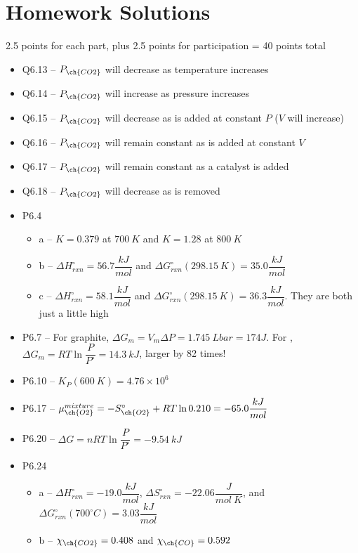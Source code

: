 \documentclass[12pt, openany, letterpaper]{memoir}
\begin{document}
\section*{Homework Solutions}
2.5 points for each part, plus 2.5 points for participation = 40 points total
\begin{itemize}
	\item Q6.13 -- $P_{\ch{CO2}}$ will decrease as temperature increases
	\item Q6.14 -- $P_{\ch{CO2}}$ will increase as pressure increases
	\item Q6.15 -- $P_{\ch{CO2}}$ will decrease as  is added at constant $P$ ($V$ will increase)
	\item Q6.16 -- $P_{\ch{CO2}}$ will remain constant as  is added at constant $V$
	\item Q6.17 -- $P_{\ch{CO2}}$ will remain constant as a catalyst is added
	\item Q6.18 -- $P_{\ch{CO2}}$ will decrease as  is removed
	\item P6.4
	\begin{itemize}
		\item a -- $K=0.379$ at $700~K$ and $K=1.28$ at $800~K$
		\item b -- $\Delta H_{rxn}^\circ = 56.7\dfrac{kJ}{mol}$ and $\Delta G_{rxn}^\circ(298.15~K)=35.0\dfrac{kJ}{mol}$
		\item c -- $\Delta H_{rxn}^\circ = 58.1\dfrac{kJ}{mol}$ and $\Delta G_{rxn}^\circ(298.15~K)=36.3\dfrac{kJ}{mol}$. They are both just a little high
	\end{itemize} 
	\item P6.7 -- For graphite, $\Delta G_m = V_m\Delta P = 1.745~Lbar = 174 J$. For , $\Delta G_m = RT\ln\dfrac{P}{P^\circ}=14.3~kJ$, larger by 82 times!	
	\item P6.10 -- $K_P(600~K) = 4.76\times10^6$
	\item P6.17 -- $\mu_{\ch{O2}}^{mixture}=-S_{\ch{O2}}^\circ + RT\ln0.210 = -65.0\dfrac{kJ}{mol}$
	\item P6.20 -- $\Delta G = nRT\ln\dfrac{P}{P^\circ}=-9.54~kJ$
	\item P6.24
	\begin{itemize}
		\item a -- $\Delta H_{rxn}^\circ = -19.0\dfrac{kJ}{mol}$, $\Delta S_{rxn}^\circ = -22.06\dfrac{J}{mol~K}$, and $\Delta G_{rxn}^\circ(700^\circ C) = 3.03\dfrac{kJ}{mol}$
		\item b -- $\chi_{\ch{CO2}} = 0.408$ and $\chi_{\ch{CO}} = 0.592$
	\end{itemize}
\end{itemize}
\end{document}
